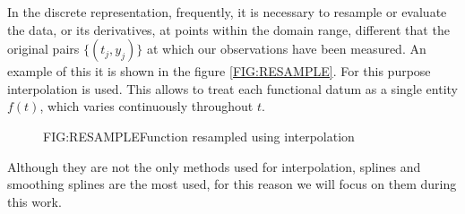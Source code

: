 
In the discrete representation, frequently, it is necessary to resample or
evaluate the data, or its derivatives, at points within the domain range,
different that the original pairs $\{(t_j, y_j)\}$ at which our observations
have been measured. An example of this it is shown in the figure
\ref{FIG:RESAMPLE}. For this purpose interpolation is used.
This allows to treat each functional datum as a single entity $f(t)$, which
varies continuously throughout $t$.

\begin{figure}[Function resampled using interpolation]{FIG:RESAMPLE}{Function resampled using interpolation}

   \quad
\end{figure}

Although they are not the only methods used for interpolation, splines and
smoothing splines are the most used, for this reason we will focus on them
during this work.
